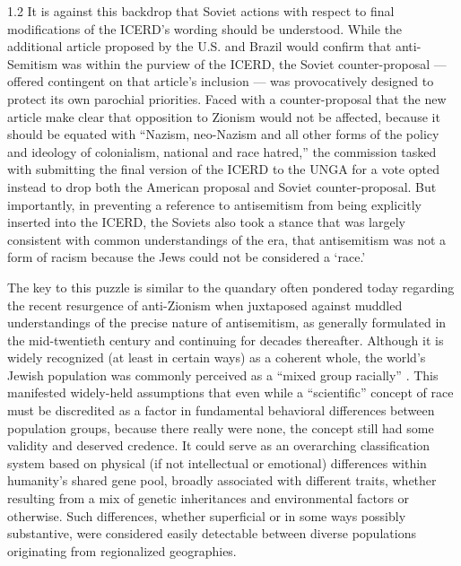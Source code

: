 \documentclass[../unravbook.tex]{subfiles}
\begin{document}
\begin{spacing}{1.2}
It is against this backdrop that Soviet actions with respect to final modifications of the ICERD's wording should be understood. While the additional article proposed by the U.S. and Brazil would confirm that anti-Semitism was within the purview of the ICERD, the Soviet counter-proposal --- offered contingent on that article's inclusion --- was provocatively designed to protect its own parochial priorities. Faced with a counter-proposal that the new article make clear that opposition to Zionism would not be affected, because it should be equated with ``Nazism, neo-Nazism and all other forms of the policy and ideology of colonialism, national and race hatred,'' the commission tasked with submitting the final version of the ICERD to the UNGA for a vote opted instead to drop both the American proposal and Soviet counter-proposal. But importantly, in preventing a reference to antisemitism from being explicitly inserted into the ICERD, the Soviets also took a stance that was largely consistent with common understandings of the era, that antisemitism was not a form of racism because the Jews could not be considered a `race.'  


The key to this puzzle is similar to the quandary often pondered today regarding the recent resurgence of anti-Zionism when juxtaposed against muddled understandings of the precise nature of antisemitism, as generally formulated in the mid-twentieth century and continuing for decades thereafter. Although it is widely recognized (at least in certain ways) as a coherent whole, the world's Jewish population was commonly perceived as a ``mixed group racially'' \parencite[268]{Graeber-1953}. This manifested widely-held assumptions that even while a ``scientific'' concept of race must be discredited as a factor in fundamental behavioral differences between population groups, because there really were none, the concept still had some validity and deserved credence. It could serve as an overarching classification system based on physical (if not intellectual or emotional) differences within humanity's shared gene pool, broadly associated with different traits, whether resulting from a mix of genetic inheritances and environmental factors or otherwise. Such differences, whether superficial or in some ways possibly substantive, were considered easily detectable between diverse populations originating from regionalized geographies. 


\end{spacing}
\end{document}
